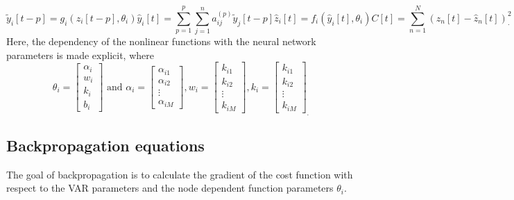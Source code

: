 \begin{subequations}
    \begin{equation} \label{eq:forward_g}
        \tilde{y}_{i}[t-p] =g_{i}\left(z_{i}[t-p], \theta_{i}\right)
    \end{equation}
    \begin{equation} \label{eq:forward_A}
        \hat{y}_{i}[t] =\sum_{p=1}^{p}\sum_{j=1}^{n}  a_{i j}^{(p)} \tilde{y}_{j} [t-p] 
    \end{equation}
    \begin{equation} \label{eq:forward_f}
        \hat{z}_{i}[t] =f_{i}\left(\hat{y}_{i}[t], \theta_{i}\right) 
    \end{equation}
    \begin{equation} \label{eq:forward_cost}
        C[t] =\sum_{n=1}^{N}\left(z_{n}[t]-\hat{z}_{n}[t]\right)^{2}_\cdot
    \end{equation}
\end{subequations}
Here, the dependency of the nonlinear functions with the neural network parameters is made explicit, where $$\theta_{i}=\left[\begin{array}{l}\alpha_{ i} \\  w_i\\ k_{ i} \\ b_{i}\end{array}\right] \text{ and } 
\alpha_{i}=\left[\begin{array}{c}
\alpha_{i 1} \\
\alpha_{i 2} \\
\vdots \\
\alpha_{i M}
\end{array}\right],w_{i}=\left[\begin{array}{c}
k_{i 1} \\
k_{i 2} \\
\vdots \\
k_{i M}
\end{array}\right], k_{i}=\left[\begin{array}{c}
k_{i 1} \\
k_{i 2} \\
\vdots \\
k_{i M}
\end{array}\right]_. $$

\subsection{Backpropagation equations}
\label{ss:backprop}
The goal of backpropagation is to  calculate the gradient of the cost function with respect to the VAR parameters and the node dependent function parameters $\theta_i$.

